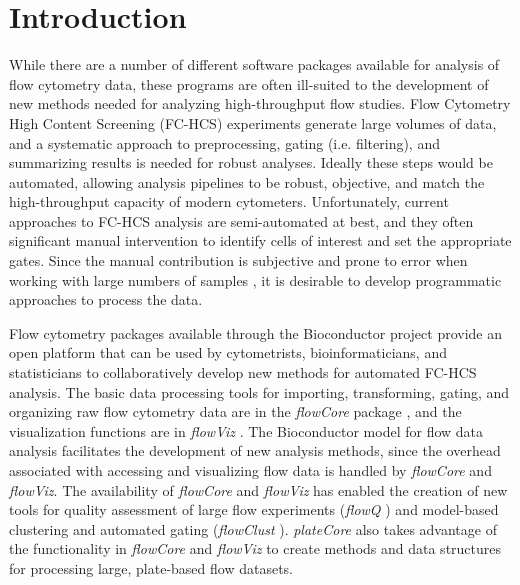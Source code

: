 \documentclass[12pt]{article}
\newcommand{\Rpackage}[1]{{\textit{#1}}}
\begin{document}
\clearpage
\section*{Introduction}

While there are a number of different software packages available for analysis of flow cytometry data, these programs are often
ill-suited to the development of new methods needed for analyzing high-throughput flow studies.
Flow Cytometry High Content Screening (FC-HCS) experiments generate large volumes of data, and a systematic approach to
preprocessing, gating (i.e. filtering), and summarizing results is needed for robust analyses. 
Ideally these steps would be automated,
allowing analysis pipelines to be robust, objective, and match the high-throughput capacity of modern cytometers. 
Unfortunately, current approaches to FC-HCS analysis are semi-automated at best,
and they often significant manual intervention to identify cells of interest and set the appropriate gates. 
Since the manual contribution is subjective and prone to error when working with large numbers of samples \citep{Maecker2005},
it is desirable to develop programmatic approaches to process the data.

Flow cytometry packages available through the Bioconductor \citep{BIOC} project provide an open platform that
can be used by cytometrists, bioinformaticians, and statisticians to collaboratively develop new methods for
automated FC-HCS analysis.  The basic data processing tools for importing, transforming, gating, and
organizing raw flow cytometry data are in the \Rpackage{flowCore} package \citep{hahne2009}, and the visualization functions are
in \Rpackage{flowViz} \citep{sarkar2008ufv}. The Bioconductor model for flow data analysis facilitates
the development of new analysis methods, since the overhead associated with
accessing and visualizing flow data is handled by \Rpackage{flowCore} and \Rpackage{flowViz}.
The availability of \Rpackage{flowCore} and \Rpackage{flowViz} has enabled the creation of new tools for
quality assessment of large flow experiments (\Rpackage{flowQ} \citep{}) and model-based clustering and automated gating
(\Rpackage{flowClust} \cite{lo2008agf}).
\Rpackage{plateCore} also takes advantage of the functionality in \Rpackage{flowCore} and \Rpackage{flowViz}
to create methods and data structures for processing large, plate-based flow datasets.  
\end{document}
